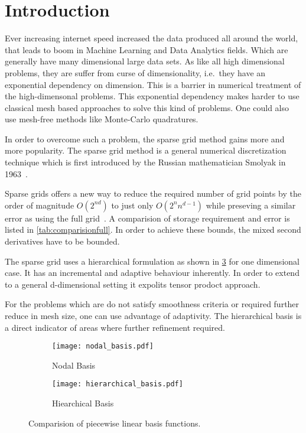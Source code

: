 \section{Introduction}

Ever increasing internet speed increased the data produced all around the world, that leads to boom in Machine Learning and Data Analytics fields.
Which are generally have many dimensional large data sets. As like all high dimensional problems, they are suffer from curse of dimensionality, i.e.\ they have an
exponential dependency on dimension. This is a barrier in numerical treatment of the high-dimensonal problems.
This exponential dependency makes harder to use classical mesh based approaches to solve this kind of problems. One could also use mesh-free methods like Monte-Carlo quadratures.

In order to overcome such a problem, the sparse grid method gains more and more popularity.
The sparse grid method is a general numerical discretization technique which is first introduced by  the Russian mathematician Smolyak in 1963~\cite{smolyak1963quadrature}.

Sparse grids offers a new way to reduce the required number of grid points by the order of magnitude \(O(2^{nd})\) to just only \(O(2^n n^{d-1})\) while preseving a similar error as using the full grid~\cite{Garcke2012}.
A comparision of storage requirement and error is listed in \cref{tab:comparisionfull}.
In order to achieve these bounds, the mixed second derivatives have to be bounded.

The sparse grid uses a hierarchical formulation as shown in \cref{fig:basiscomp} for one dimensional case.
It has an incremental and adaptive behaviour inherently. In order to extend to a general d-dimensional setting it expolits
tensor prodoct approach.

For the problems which are do not satisfy smoothness criteria or required further reduce in mesh size, one can use advantage of adaptivity.
The hierarchical basis is a direct indicator of areas where further refinement required.

\begin{figure}[hbpt]
    \centering
    \begin{subfigure}{0.45\textwidth}
        \texttt{[image: nodal\_basis.pdf]}
        \caption{Nodal Basis}
        \label{fig:nodalbasis}
    \end{subfigure}
    \begin{subfigure}{0.45\textwidth}
        \texttt{[image: hierarchical\_basis.pdf]}
        \caption{Hiearchical Basis}
        \label{fig:hierarchicalbasis}
    \end{subfigure}
    \caption{Comparision of piecewise linear basis functions.}
    \label{fig:basiscomp}
\end{figure}

